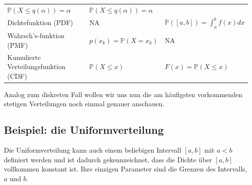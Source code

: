 \documentclass[]{book}
\begin{document}
\begin{longtable}[]{@{}lll@{}}
\begin{minipage}[t]{0.38\columnwidth}
\(\mathbb{P}(X\leq q(\alpha))=\alpha\)\strut
\end{minipage} & \begin{minipage}[t]{0.37\columnwidth}\raggedright\strut
\(\mathbb{P}(X\leq q(\alpha))=\alpha\)\strut
\end{minipage}\tabularnewline
\begin{minipage}[t]{0.17\columnwidth}\raggedright\strut
Dichtefunktion (PDF)\strut
\end{minipage} & \begin{minipage}[t]{0.38\columnwidth}\raggedright\strut
NA\strut
\end{minipage} & \begin{minipage}[t]{0.37\columnwidth}\raggedright\strut
\(\mathbb{P}([a,b])=\int_a^bf(x)dx\)\strut
\end{minipage}\tabularnewline
\begin{minipage}[t]{0.17\columnwidth}\raggedright\strut
Wahrsch's-funktion (PMF)\strut
\end{minipage} & \begin{minipage}[t]{0.38\columnwidth}\raggedright\strut
\(p(x_k)=\mathbb{P}(X=x_k)\)\strut
\end{minipage} & \begin{minipage}[t]{0.37\columnwidth}\raggedright\strut
NA\strut
\end{minipage}\tabularnewline
\begin{minipage}[t]{0.17\columnwidth}\raggedright\strut
Kumulierte Verteilungsfunktion (CDF)\strut
\end{minipage} & \begin{minipage}[t]{0.38\columnwidth}\raggedright\strut
\(\mathbb{P}(X\leq x)\)\strut
\end{minipage} & \begin{minipage}[t]{0.37\columnwidth}\raggedright\strut
\(F(x)=\mathbb{P}(X\leq x)\)\strut
\end{minipage}\tabularnewline
\bottomrule
\end{longtable}

Analog zum diskreten Fall wollen wir uns nun die am häufigsten
vorkommenden stetigen Verteilungen noch einmal genauer anschauen.

\subsection{Beispiel: die
Uniformverteilung}\label{beispiel-die-uniformverteilung}

Die Uniformverteilung kann auch einem beliebigen Intervall \([a,b]\) mit
\(a<b\) definiert werden und ist dadurch gekennzeichnet, dass die Dichte
über \([a,b]\) vollkommen konstant ist. Ihre einzigen Parameter sind die
Grenzen des Intervalls, \(a\) und \(b\).
\end{document}
